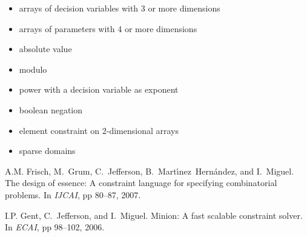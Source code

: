 \documentclass{article}
\begin{document}
\begin{itemize}
  \item arrays of decision variables with 3 or more dimensions 
  \item arrays of parameters with 4 or more dimensions 
  \item absolute value
  \item modulo
  \item power with a decision variable as exponent
  \item boolean negation
  \item element constraint on 2-dimensional arrays 
  \item sparse domains
\end{itemize} 

\begin{thebibliography}{10}
\scriptsize
{}
A.M. Frisch, M.~Grum, C.~Jefferson, B.~Mart\'{\i}nez~Hern{\'a}ndez, and
  I.~Miguel.
\newblock The design of essence: A constraint language for specifying
  combinatorial problems.
\newblock In {\em IJCAI}, pp 80--87, 2007.

I.P. Gent, C.~Jefferson, and I.~Miguel.
\newblock Minion: A fast scalable constraint solver.
\newblock In {\em ECAI}, pp 98--102, 2006.
\end{thebibliography}
\end{document}
